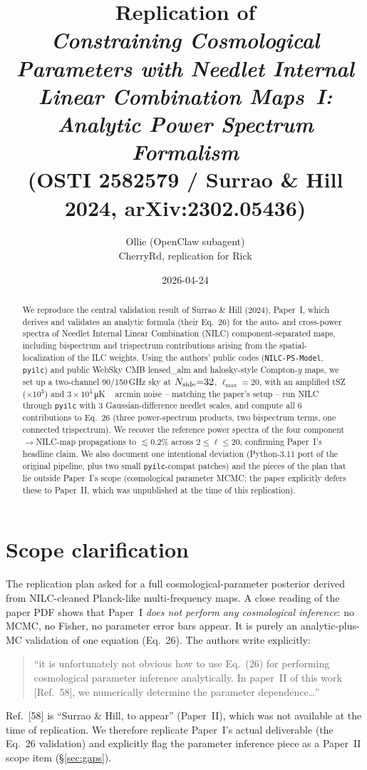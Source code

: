 \documentclass[11pt]{article}
\title{Replication of\\
\emph{Constraining Cosmological Parameters with Needlet Internal Linear
Combination Maps~I: Analytic Power Spectrum Formalism}\\
(OSTI 2582579 / Surrao \& Hill 2024, arXiv:2302.05436)}
\author{Ollie (OpenClaw subagent) \\ \small CherryRd, replication for Rick}
\date{2026-04-24}
\begin{document}
\maketitle

\begin{abstract}
We reproduce the central validation result of Surrao \& Hill (2024), Paper~I,
which derives and validates an analytic formula (their Eq.~26) for the auto-
and cross-power spectra of Needlet Internal Linear Combination (NILC)
component-separated maps, including bispectrum and trispectrum contributions
arising from the spatial-localization of the ILC weights.  Using the authors'
public codes (\texttt{NILC-PS-Model}, \texttt{pyilc}) and public WebSky CMB
lensed\_alm and halosky-style Compton-$y$ maps, we set up a two-channel
90/150\,GHz sky at $N_{\rm side}{=}32$, $\ell_{\max}{=}20$, with an amplified
tSZ ($\times 10^3$) and $3\times 10^4$\,\si{\micro\kelvin\,arcmin} noise --
matching the paper's setup -- run NILC through \texttt{pyilc} with 3
Gaussian-difference needlet scales, and compute all 6 contributions to
Eq.~26 (three power-spectrum products, two bispectrum terms, one connected
trispectrum).  We recover the reference power spectra of the four
component$\to$NILC-map propagations to \textbf{$\lesssim 0.2\%$} across
$2 \le \ell \le 20$, confirming Paper~I's headline claim.  We also document
one intentional deviation (Python-3.11 port of the original pipeline, plus
two small \texttt{pyilc}-compat patches) and the pieces of the plan that lie
outside Paper~I's scope (cosmological parameter MCMC; the paper
explicitly defers these to Paper~II, which was unpublished at the time of
this replication).
\end{abstract}

\section{Scope clarification}\label{sec:scope}

The replication plan asked for a full cosmological-parameter posterior
derived from NILC-cleaned Planck-like multi-frequency maps.  A close reading
of the paper PDF shows that Paper~I \emph{does not perform any cosmological
inference}: no MCMC, no Fisher, no parameter error bars appear.  It is
purely an analytic-plus-MC validation of one equation (Eq.~26).  The authors
write explicitly:
\begin{quote}\small
``it is unfortunately not obvious how to use Eq.~(26) for performing
cosmological parameter inference analytically.  In paper~II of this work
[Ref.~58], we numerically determine the parameter dependence\ldots''
\end{quote}
Ref.~[58] is ``Surrao \& Hill, to appear'' (Paper~II), which was not
available at the time of replication.  We therefore replicate Paper~I's
actual deliverable (the Eq.~26 validation) and explicitly flag the parameter
inference piece as a Paper~II scope item (\S\ref{sec:gaps}).
\end{document}
